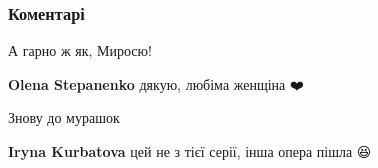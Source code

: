  
 
 
 
 
\subsubsection{Коментарі}
\label{sec:08_08_2021.fb.miroslava_iltjo.1.chelovek_poezia.cmt}

\begin{itemize}
 
А гарно ж як, Миросю!

\begin{itemize}
 
\textbf{Olena Stepanenko} дякую, любіма женщіна ❤️
\end{itemize}

 
Знову до мурашок👏👏👏

\begin{itemize}
 
\textbf{Iryna Kurbatova} цей не з тієї серії, інша опера пішла 😆

 

\end{itemize}
\end{itemize}
